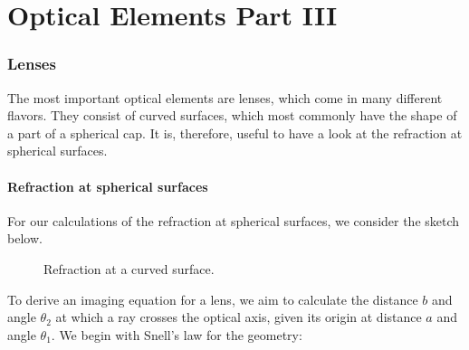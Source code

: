 \documentclass[
  a4paper,
]{book}
\begin{document}
\chapter{Optical Elements Part III}\label{optical-elements-part-iii}

\subsection{Lenses}\label{lenses}

The most important optical elements are lenses, which come in many
different flavors. They consist of curved surfaces, which most commonly
have the shape of a part of a spherical cap. It is, therefore, useful to
have a look at the refraction at spherical surfaces.

\subsubsection{Refraction at spherical
surfaces}\label{refraction-at-spherical-surfaces}

For our calculations of the refraction at spherical surfaces, we
consider the sketch below.

\begin{figure}


\caption{\label{fig-curved-surface}Refraction at a curved surface.}

\end{figure}%

To derive an imaging equation for a lens, we aim to calculate the
distance \(b\) and angle \(\theta_2\) at which a ray crosses the optical
axis, given its origin at distance \(a\) and angle \(\theta_1\). We
begin with Snell's law for the geometry:
\end{document}
